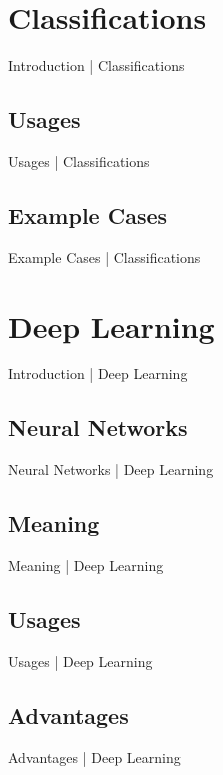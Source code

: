 \documentclass[10pt]{beamer}
\begin{document}
\section{Classifications}
\begin{frame}{Introduction | Classifications}
\end{frame}
\subsection{Usages}
\begin{frame}{Usages | Classifications}
\end{frame}
\subsection{Example Cases}
\begin{frame}{Example Cases | Classifications}
\end{frame}


\section{Deep Learning}
\begin{frame}{Introduction | Deep Learning}
\end{frame}
\subsection{Neural Networks}
\begin{frame}{Neural Networks | Deep Learning}
\end{frame}
\subsection{Meaning}
\begin{frame}{Meaning | Deep Learning}
\end{frame}
\subsection{Usages}
\begin{frame}{Usages | Deep Learning}
\end{frame}
\subsection{Advantages}
\begin{frame}{Advantages | Deep Learning}
\end{frame}
\end{document}
